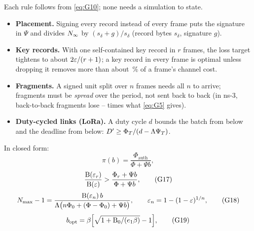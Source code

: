 \documentclass[11pt,a4paper]{article}
\begin{document}
Each rule follows from \eqref{eq:G10}; none needs a simulation to state.
\begin{itemize}
\item \textbf{Placement.} Signing every record instead of every frame puts the signature in $\Psi$
and divides $N_{\infty}$ by $(s_\delta+g)/s_\delta$ (record bytes $s_\delta$, signature $g$).
\item \textbf{Key records.} With one self-contained key record in $r$ frames, the loss target
tightens to about $2\varepsilon/(r+1)$; a key record in every frame is optimal unless dropping it removes
more than about \keyShare\,\% of a frame's channel cost.
\item \textbf{Fragments.} A signed unit split over $n$ frames needs all $n$ to arrive; fragments
must be \emph{spread} over the period, not sent back to back (in ns-3, back-to-back fragments lose
\fragBurstMin--\fragBurstMax{} times what \eqref{eq:G5} gives).
\item \textbf{Duty-cycled links (LoRa).} A duty cycle $d$ bounds the batch from below and the
deadline from below: $D'\ge\Phi_T/(d-\Lambda\Psi_T)$.
\end{itemize}
In closed form:
\begin{equation}
\pi(b)=\frac{\Phi_{\mathrm{auth}}}{\Phi+\Psi b}, \tag{G16}\label{eq:G16}
\end{equation}
\begin{equation}
\frac{\mathrm{B}(\varepsilon_r)}{\mathrm{B}(\varepsilon)}>\frac{\Phi_r+\Psi b}{\Phi+\Psi b}, \tag{G17}\label{eq:G17}
\end{equation}
\begin{equation}
N_{\max}-1=\frac{\mathrm{B}(\varepsilon_n)\,b}{\Lambda\bigl(n\Phi_0+(\Phi-\Phi_0)+\Psi b\bigr)},\qquad
\varepsilon_n=1-(1-\varepsilon)^{1/n}, \tag{G18}\label{eq:G18}
\end{equation}
\begin{equation}
b_{\mathrm{opt}}=\beta\Bigl[\sqrt{1+\mathrm{B}_0/(e_1\beta)}-1\Bigr], \tag{G19}\label{eq:G19}
\end{equation}
\end{document}
